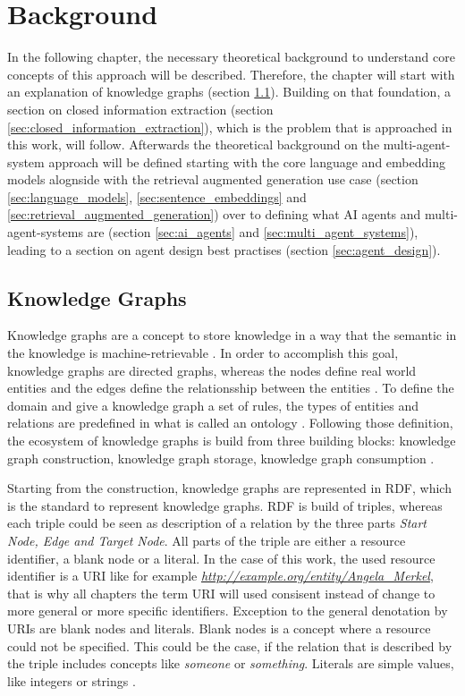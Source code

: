 \documentclass[a4paper,oneside,bibliography=totoc]{scrbook}
\begin{document}
\chapter{Background}
\label{ch:related_work}
In the following chapter, the necessary theoretical background to understand core concepts of this approach will be described. Therefore, the chapter will start with an explanation of knowledge graphs (section \ref{sec:knowledge_graphs}). Building on that foundation, a section on closed information extraction (section \ref{sec:closed_information_extraction}), which is the problem that is approached in this work, will follow. Afterwards the theoretical background on the multi-agent-system approach will be defined starting with the core language and embedding models alognside with the retrieval augmented generation use case (section \ref{sec:language_models}, \ref{sec:sentence_embeddings} and \ref{sec:retrieval_augmented_generation}) over to defining what \ac{AI} agents and multi-agent-systems are (section \ref{sec:ai_agents} and \ref{sec:multi_agent_systems}), leading to a section on agent design best practises (section \ref{sec:agent_design}).
\section{Knowledge Graphs}
\label{sec:knowledge_graphs}
Knowledge graphs are a concept to store knowledge in a way that the semantic in the knowledge is machine-retrievable \cite{GomezPerez2017}. In order to accomplish this goal, knowledge graphs are directed graphs, whereas the nodes define real world entities and the edges define the relationsship between the entities \cite{Paulheim2016}. To define the domain and give a knowledge graph a set of rules, the types of entities and relations are predefined in what is called an ontology \cite{GomezPerez2017,Paulheim2016}. Following those definition, the ecosystem of knowledge graphs is build from three building blocks: knowledge graph construction, knowledge graph storage, knowledge graph consumption \cite{GomezPerez2017}.

Starting from the construction, knowledge graphs are represented in \ac{RDF}, which is the standard to represent knowledge graphs. \ac{RDF} is build of triples, whereas each triple could be seen as description of a relation by the three parts \textit{Start Node, Edge and Target Node}. All parts of the triple are either a resource identifier, a blank node or a literal. In the case of this work, the used resource identifier is a \ac{URI} like for example \textit{\url{http://example.org/entity/Angela_Merkel}}, that is why all chapters the term \ac{URI} will used consisent instead of change to more general or more specific identifiers. Exception to the general denotation by \acp{URI} are blank nodes and literals. Blank nodes is a concept where a resource could not be specified. This could be the case, if the relation that is described by the triple includes concepts like \textit{someone} or \textit{something}. Literals are simple values, like integers or strings \cite{VillazonTerrazas2017}.
\end{document}
